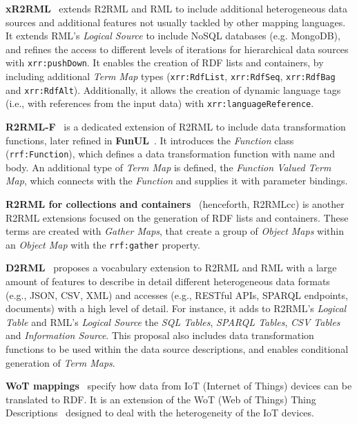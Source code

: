\noindent\textbf{xR2RML}~\parencite{michel2015xr2rml} extends R2RML and RML to include additional heterogeneous data sources and additional features not usually tackled by other mapping languages. It extends RML's \textit{Logical Source} to include NoSQL databases (e.g. MongoDB), and refines the access to different levels of iterations for hierarchical data sources with \texttt{xrr:pushDown}. It enables the creation of RDF lists and containers, by including additional \textit{Term Map} types (\texttt{xrr:RdfList}, \texttt{xrr:RdfSeq}, \texttt{xrr:RdfBag} and \texttt{xrr:RdfAlt}). Additionally, it allows the creation of dynamic language tags (i.e., with references from the input data) with \texttt{xrr:languageReference}.

\noindent\textbf{R2RML-F}~\parencite{debruyne2016r2rmlf} is a dedicated extension of R2RML to include data transformation functions, later refined in \textbf{FunUL}~\parencite{junior2016funul}. It introduces the \textit{Function} class (\texttt{rrf:Function}), which defines a data transformation function with name and body. An additional type of \textit{Term Map} is defined, the \textit{Function Valued Term Map}, which connects with the \textit{Function} and supplies it with parameter bindings. 

\noindent\textbf{R2RML for collections and containers}~\parencite{debruyne2017R2RML-collections} (henceforth, R2RMLcc) is another R2RML extensions focused on the generation of RDF lists and containers. These terms are created with \textit{Gather Maps}, that create a group of \textit{Object Maps} within an \textit{Object Map} with the \texttt{rrf:gather} property. 

\noindent\textbf{D2RML}~\parencite{chortaras2018d2rml} proposes a vocabulary extension to R2RML and RML with a large amount of features to describe in detail different heterogeneous data formats (e.g., JSON, CSV, XML) and accesses (e.g., RESTful APIs, SPARQL endpoints, documents) with a high level of detail. For instance, it adds to R2RML's \textit{Logical Table} and RML's \textit{Logical Source} the \textit{SQL Tables}, \textit{SPARQL Tables}, \textit{CSV Tables} and \textit{Information Source}. This proposal also includes data transformation functions to be used within the data source descriptions, and enables conditional generation of \textit{Term Maps}. 

\noindent\textbf{WoT mappings}~\parencite{cimmino2020ewot} specify how data from IoT (Internet of Things) devices can be translated to RDF. It is an extension of the WoT (Web of Things) Thing Descriptions~\parencite{wot-td} designed to deal with the heterogeneity of the IoT devices. 


